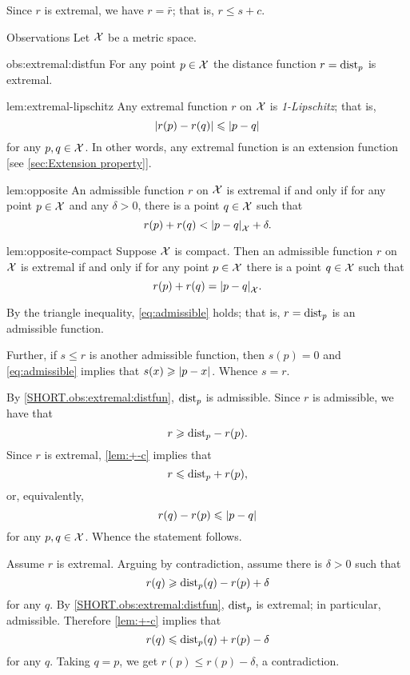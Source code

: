 Since $r$ is extremal, we have $r=\bar r$;
that is, $r\le s+c$.
\qeds

\begin{thm}{Observations}\label{obs:extremal}
Let $\mathcal{X}$ be a metric space.

\begin{subthm}{obs:extremal:distfun}
For any point $p\in\mathcal{X}$
the distance function $r\z=\distfun_p$ is extremal.
\end{subthm}

\begin{subthm}{lem:extremal-lipschitz}
Any extremal function $r$ on $\mathcal{X}$ is \emph{1-Lipschitz};
that is,
\[|r(p)-r(q)|\le \dist{p}{q}{}\]
for any $p,q\in\mathcal{X}$.
In other words, any extremal function is an extension function [see \ref{sec:Extension property}].
\end{subthm}

\begin{subthm}{lem:opposite}
An admissible function $r$ on $\mathcal{X}$ is extremal if and only if
for any point $p\in\mathcal{X}$ and any $\delta>0$, there is a point $q\in \mathcal{X}$
such that 
\[r(p)+r(q)<\dist{p}{q}{\spc{X}}+\delta.\]
\end{subthm}

\begin{subthm}{lem:opposite-compact}
Suppose $\mathcal{X}$ is compact.
Then an admissible function $r$ on $\mathcal{X}$ is extremal if and only if
for any point $p\in\mathcal{X}$ there is a point $q\in \mathcal{X}$
such that 
\[r(p)+r(q)=\dist{p}{q}{\spc{X}}.\]
\end{subthm}

\end{thm}

By the triangle inequality, \ref{eq:admissible} holds;
that is, $r=\mathrm{dist}_p$ is an admissible function.

Further, if $s\le r$ is another admissible function, then $s(p)=0$ and \ref{eq:admissible} implies that $s(x)\z\ge\dist{p}{x}{}$.
Whence $s=r$.

By \ref{SHORT.obs:extremal:distfun}, $\mathrm{dist}_p$ is admissible.
Since $r$ is admissible, we have that
\[r\geqslant \mathrm{dist}_p-r(p).\]
Since $r$ is extremal, \ref{lem:+-c} implies that
\[r\leqslant \mathrm{dist}_p+r(p),\]
or, equivalently,
\[r(q)-r(p)\le \dist{p}{q}{}\]
for any $p,q\in\mathcal{X}$.
Whence the statement follows.

Assume $r$ is extremal.
Arguing by contradiction, assume there is $\delta>0$ such that
\[r(q)\geqslant \mathrm{dist}_p(q)-r(p)+\delta\]
for any $q$.
By \ref{SHORT.obs:extremal:distfun}, $\mathrm{dist}_p$ is extremal; in particular, admissible.
Therefore \ref{lem:+-c} implies that
\[r(q)\leqslant \mathrm{dist}_p(q)+r(p)-\delta\]
for any $q$.
Taking $q=p$, we get $r(p)\le r(p)-\delta$, a contradiction.

